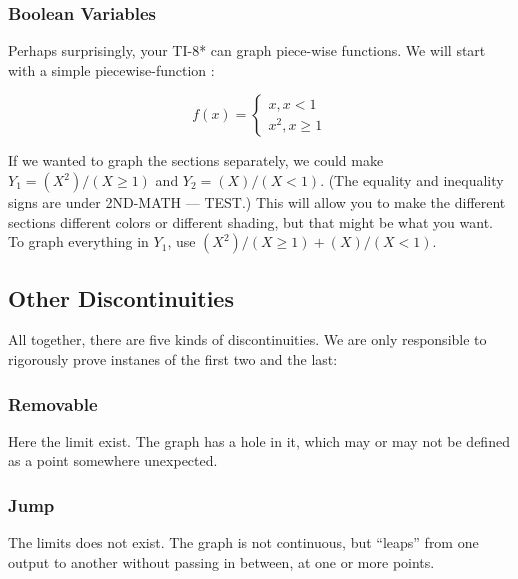 \subsubsection{Boolean Variables}
Perhaps surprisingly, your TI-8* can graph piece-wise functions.  We will start with a simple
piecewise-function :

$$
f(x)=
\begin{cases}
x, x<1\\
x^2,x\ge 1
\end{cases}
$$



If we wanted to graph the sections separately, we could make $Y_1=(X^2)/(X\ge{}1)$ and
$Y_2=(X)/(X<1)$.  (The equality and inequality signs are under 2ND-MATH --- TEST.)  This will 
allow you to make the different sections different colors or different shading, but that might be
what you want.  To graph everything in $Y_1$, use $(X^2)/(X\ge{}1)+(X)/(X<1)$.



\subsection{Other Discontinuities}


All together, there are five kinds of discontinuities.  We are only responsible to rigorously prove
instanes of the first two and the last:

\subsubsection{Removable}
Here the limit exist.  The graph has a hole in it, which may or may not be defined as a point somewhere unexpected.


\subsubsection{Jump}
The limits does not exist.  The graph is not continuous, but ``leaps'' from one output to another without passing in between, at one or more points.

